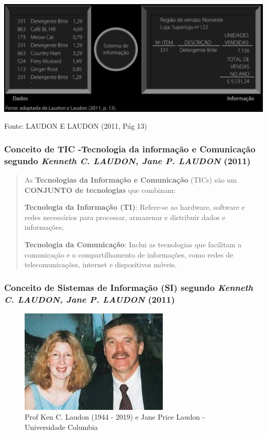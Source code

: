 \documentclass[
]{book}
\begin{document}
\includegraphics{images/1-dados-info/Dados-Info.jpg}

Fonte: LAUDON E LAUDON (2011, Pág 13)

\subsubsection{\texorpdfstring{Conceito de TIC -Tecnologia da informação e Comunicação \textbf{segundo} \emph{Kenneth C. LAUDON, Jane P. LAUDON} (2011)}{Conceito de TIC -Tecnologia da informação e Comunicação segundo Kenneth C. LAUDON, Jane P. LAUDON (2011)}}\label{conceito-de-tic--tecnologia-da-informauxe7uxe3o-e-comunicauxe7uxe3o-segundo-kenneth-c.-laudon-jane-p.-laudon-2011}

\begin{quote}
As \textbf{Tecnologias da Informação e Comunicação} (TICs) são um \textbf{CONJUNTO de tecnologias} que combinam:

\textbf{Tecnologia da Informação (TI)}: Refere-se ao hardware, software e redes necessários para processar, armazenar e distribuir dados e informações;

\textbf{Tecnologia da Comunicação}: Inclui as tecnologias que facilitam a comunicação e o compartilhamento de informações, como redes de telecomunicações, internet e dispositivos móveis.
\end{quote}

\subsubsection{\texorpdfstring{Conceito de Sistemas de Informação (SI) segundo \emph{Kenneth C. LAUDON, Jane P. LAUDON} (2011)}{Conceito de Sistemas de Informação (SI) segundo Kenneth C. LAUDON, Jane P. LAUDON (2011)}}\label{conceito-de-sistemas-de-informauxe7uxe3o-si-segundo-kenneth-c.-laudon-jane-p.-laudon-2011}

\begin{figure}
\centering
\includegraphics{images/Ken_Jane.jpg}
\caption{Prof Ken C. Laudon (1944 - 2019) e Jane Price Laudon - Universidade Columbia}
\end{figure}
\end{document}
